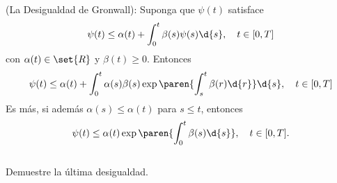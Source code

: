 \documentclass{homework}
\begin{document}
\begin{prob}
    (La Desigualdad de Gronwall): Suponga que \(\psi(t)\) satisface
    \[\psi(t)\leq\alpha(t)+\int_0^t\beta(s)\psi(s)\d{s},\quad t\in[0,T]\]
    con \(\alpha(t)\in\set{R}\) y \(\beta(t)\geq0\). Entonces
    \[\psi(t)\leq\alpha(t)+\int_0^t\alpha(s)\beta(s)\exp\paren{\int_s^t\beta(r)\d{r}}\d{s},\quad t\in[0,T]\]
    Es más, si además \(\alpha(s)\leq\alpha(t)\) para \(s\leq t\), entonces
    \[\psi(t)\leq\alpha(t)\exp\paren{\int_0^t\beta(s)\d{s}},\quad t\in[0,T].\]\\
    Demuestre la última desigualdad.
\end{prob}

\begin{sol}

\end{sol}
\end{document}
